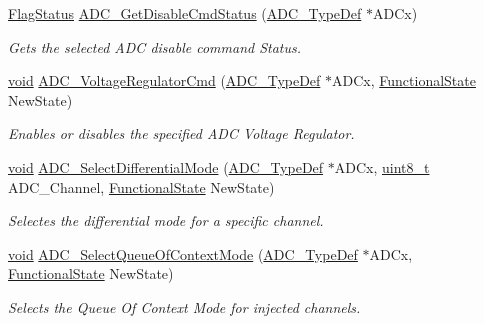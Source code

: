 \begin{DoxyCompactItemize}
\hyperlink{group___exported__types_ga89136caac2e14c55151f527ac02daaff}{Flag\-Status} \hyperlink{group___a_d_c___exported___constants_gab34a1c205ee39f6473a28a40620f81e2}{A\-D\-C\-\_\-\-Get\-Disable\-Cmd\-Status} (\hyperlink{struct_a_d_c___type_def}{A\-D\-C\-\_\-\-Type\-Def} $\ast$A\-D\-Cx)
\begin{DoxyCompactList}\small\item\em Gets the selected A\-D\-C disable command Status. \end{DoxyCompactList}\item 
\hyperlink{group___n_a_m_e_ga18028b8badbf1ea7e704ccac3c488e82}{void} \hyperlink{group___a_d_c___exported___constants_gad3fdd98cd57f2cb93c7ea7b710e97921}{A\-D\-C\-\_\-\-Voltage\-Regulator\-Cmd} (\hyperlink{struct_a_d_c___type_def}{A\-D\-C\-\_\-\-Type\-Def} $\ast$A\-D\-Cx, \hyperlink{group___exported__types_gac9a7e9a35d2513ec15c3b537aaa4fba1}{Functional\-State} New\-State)
\begin{DoxyCompactList}\small\item\em Enables or disables the specified A\-D\-C Voltage Regulator. \end{DoxyCompactList}\item 
\hyperlink{group___n_a_m_e_ga18028b8badbf1ea7e704ccac3c488e82}{void} \hyperlink{group___a_d_c___exported___constants_ga451e4ae6d52275b723aa953d72b7e325}{A\-D\-C\-\_\-\-Select\-Differential\-Mode} (\hyperlink{struct_a_d_c___type_def}{A\-D\-C\-\_\-\-Type\-Def} $\ast$A\-D\-Cx, \hyperlink{stdint_8h_aba7bc1797add20fe3efdf37ced1182c5}{uint8\-\_\-t} A\-D\-C\-\_\-\-Channel, \hyperlink{group___exported__types_gac9a7e9a35d2513ec15c3b537aaa4fba1}{Functional\-State} New\-State)
\begin{DoxyCompactList}\small\item\em Selectes the differential mode for a specific channel. \end{DoxyCompactList}\item 
\hyperlink{group___n_a_m_e_ga18028b8badbf1ea7e704ccac3c488e82}{void} \hyperlink{group___a_d_c___exported___constants_ga0891691c716087a7dddb72a9e150b51c}{A\-D\-C\-\_\-\-Select\-Queue\-Of\-Context\-Mode} (\hyperlink{struct_a_d_c___type_def}{A\-D\-C\-\_\-\-Type\-Def} $\ast$A\-D\-Cx, \hyperlink{group___exported__types_gac9a7e9a35d2513ec15c3b537aaa4fba1}{Functional\-State} New\-State)
\begin{DoxyCompactList}\small\item\em Selects the Queue Of Context Mode for injected channels. \end{DoxyCompactList}\item 

\end{DoxyCompactItemize}
